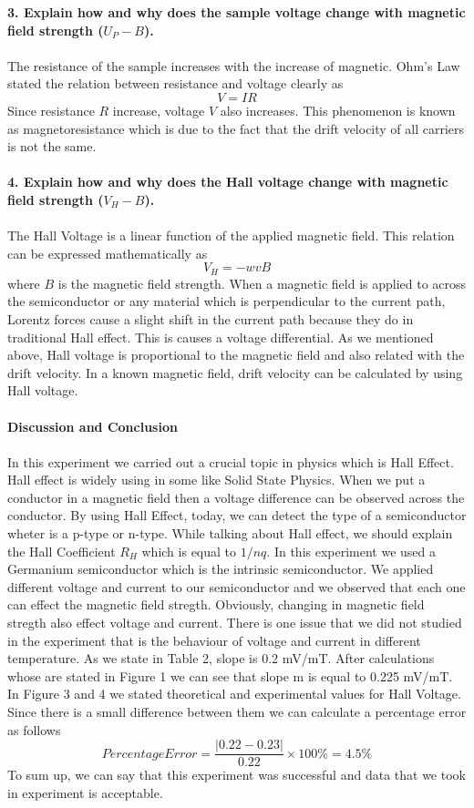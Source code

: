 \documentclass[a4paper,12pt]{article}
\begin{document}
\textbf{3. Explain how and why does the sample voltage change with magnetic field strength ($U_{P}-B$).}\\\\
The resistance of the sample increases with the increase of magnetic. Ohm's Law stated the relation between resistance and voltage clearly as
\begin{equation}
V=IR
\end{equation}
Since resistance $R$ increase, voltage $V$ also increases. This phenomenon is known as magnetoresistance which is due to the fact that the drift velocity of all carriers is not the same. \\\\
\textbf{4. Explain how and why does the Hall voltage change with magnetic field strength ($V_{H}-B$).}\\\\
The Hall Voltage is a linear function of the applied magnetic field. This relation can be expressed mathematically as
\begin{equation}
V_{H}=-wvB
\end{equation}
where $B$ is the magnetic field strength. When a magnetic field is applied to across the semiconductor or any material which is perpendicular to the current path, Lorentz forces cause a slight shift in the current path because they do in traditional Hall effect. This is causes a voltage differential. As we mentioned above, Hall voltage is proportional to the magnetic field and also related with the drift velocity. In a known magnetic field, drift velocity can be calculated by using Hall voltage.\\\\
\textbf{Discussion and Conclusion}\\\\
In this experiment we carried out a crucial topic in physics which is Hall Effect. Hall effect is widely using in some like Solid State Physics. When we put a conductor in a magnetic field then a voltage difference can be observed across the conductor. By using Hall Effect, today, we can detect the type of a semiconductor wheter is a p-type or n-type. While talking about Hall effect, we should explain the Hall Coefficient $R_{H}$ which is equal to $1/nq$. In this experiment we used a Germanium semiconductor which is the intrinsic semiconductor. We applied different voltage and current to our semiconductor and we observed that each one can effect the magnetic field stregth. Obviously, changing in magnetic field stregth also effect voltage and current. There is one issue that we did not studied in the experiment that is the behaviour of voltage and current in different temperature. As we state in Table 2, slope is 0.2 mV/mT. After calculations whose are stated in Figure 1 we can see that slope m is equal to 0.225 mV/mT. In Figure 3 and 4 we stated theoretical and experimental values for Hall Voltage. Since there is a small difference between them we can calculate a percentage error as follows 
\begin{equation}
Percentage Error=\frac{|0.22-0.23|}{0.22}\times 100\%=4.5\%
\end{equation}
To sum up, we can say that this experiment was successful and data that we took in experiment is acceptable.
\end{document}
